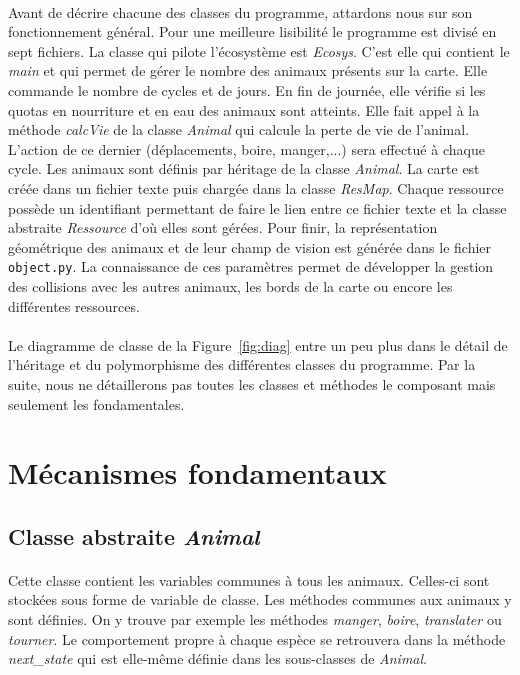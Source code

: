 \documentclass[a4paper,11pt,final,oneside]{article}
\begin{document}
\paragraph{} Avant de décrire chacune des classes du programme, attardons nous sur son fonctionnement général. Pour une meilleure lisibilité le programme est divisé en sept fichiers. La classe qui pilote l'écosystème est \textit{Ecosys}. C'est elle qui contient le \textit{main} et qui permet de gérer le nombre des animaux présents sur la carte. Elle commande le nombre de cycles et de jours. En fin de journée, elle vérifie si les quotas en nourriture et en eau des animaux sont atteints. Elle fait appel à la méthode \textit{calcVie} de la classe \textit{Animal} qui calcule la perte de vie de l'animal. L'action de ce dernier (déplacements, boire, manger,...) sera effectué à chaque cycle. Les animaux sont définis par héritage de la classe \textit{Animal}. La carte est créée dans un fichier texte puis chargée dans la classe \textit{ResMap}. Chaque ressource possède un identifiant permettant de faire le lien entre ce fichier texte et la classe abstraite \textit{Ressource} d'où elles sont gérées. Pour finir, la représentation géométrique des animaux et de leur champ de vision est générée dans le fichier \texttt{object.py}. La connaissance de ces paramètres permet de développer la gestion des collisions avec les autres animaux, les bords de la carte ou encore les différentes ressources.

\paragraph{} Le diagramme de classe de la Figure~\ref{fig:diag} entre un peu plus dans le détail de l'héritage et du polymorphisme des différentes classes du programme. Par la suite, nous ne détaillerons pas toutes les classes et méthodes le composant mais seulement les fondamentales.



	\section{Mécanismes fondamentaux}
	\label{sec:mec}

		\subsection{Classe abstraite \textit{Animal}}
		
\paragraph{} Cette classe contient les variables communes à tous les animaux. Celles-ci sont stockées sous forme de variable de classe. Les méthodes communes aux animaux y sont définies. On y trouve par exemple les méthodes \textit{manger}, \textit{boire}, \textit{translater} ou \textit{tourner}. Le comportement propre à chaque espèce se retrouvera dans la méthode \textit{next\_state} qui est elle-même définie dans les sous-classes de \textit{Animal}.
\end{document}
